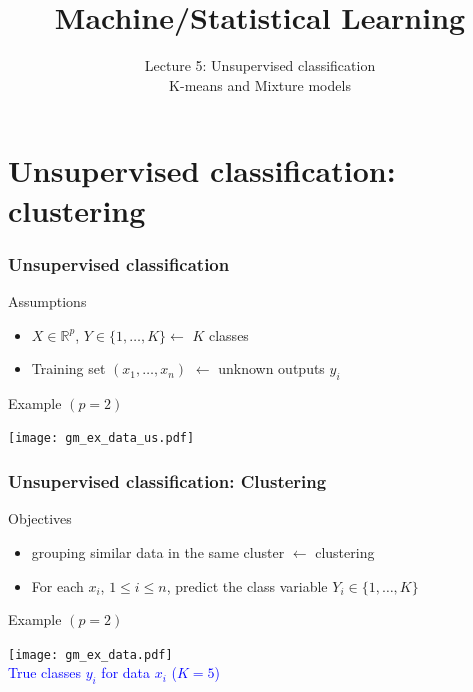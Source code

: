 \documentclass[compress, smaller, serif, 9pt]{beamer}
\title[Statistical Learning]{Machine/Statistical Learning}
\subtitle{Lecture 5: Unsupervised classification\\
K-means and Mixture models}
\institute{Filière SICOM, 3A}
\date{}
\newcommand{\structuretext}[1]{{\usebeamercolor[fg]{structure} #1}}
\newcommand{\doigt}{\structuretext{\noindent \Pisymbol{pzd}{43}}}
\begin{document}
\maketitle
\section{Unsupervised classification: clustering}
\begin{frame}
  \frametitle{Unsupervised classification}

  \begin{block}{Assumptions}
  \begin{itemize}
     \item $X \in \mathbb{R}^p$, \quad $Y \in \{1,\ldots,K\} \leftarrow$  $K$ classes
     \item Training set $(x_1,\ldots,x_n)$ \alert{ $\leftarrow$ unknown outputs $y_i$}
  \end{itemize}
  \end{block}
    \begin{block}{Example $(p=2)$}
    \vspace{-5mm}
  \begin{center}
     \texttt{[image: gm\_ex\_data\_us.pdf]}%
  \end{center}
    \end{block}
\end{frame}

\begin{frame}
  \frametitle{Unsupervised classification: Clustering}
  \begin{block}{Objectives}
  \begin{itemize}
     \item grouping similar data  in the same cluster \structuretext{$\leftarrow$ clustering}
     \item[\doigt] For each  $x_i$, $1\le i \le n$, predict the  class variable $Y_i \in \{1,\ldots,K\}$
  \end{itemize}
  \end{block}
    \begin{block}{Example $(p=2)$}
    \vspace{-5mm}
  \begin{center}
     \texttt{[image: gm\_ex\_data.pdf]} \vspace{-1mm}\\
     \textcolor{blue}{True classes $y_i$  for data $x_i$ ($K=5$)}
  \end{center}
    \end{block}
\end{frame}
\end{document}
